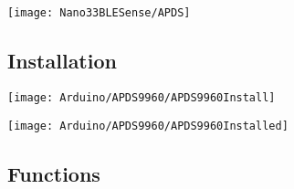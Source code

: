 \begin{center}
    \texttt{[image: Nano33BLESense/APDS]}
    \label{fig:1}
\end{center}








\subsection{Installation}


\begin{center}
  \texttt{[image: Arduino/APDS9960/APDS9960Install]}
  \label{APDS9960Install}
\end{center}

\begin{center}
    \texttt{[image: Arduino/APDS9960/APDS9960Installed]}
    \label{APDS9960Installed}
\end{center}


\subsection{Functions}

